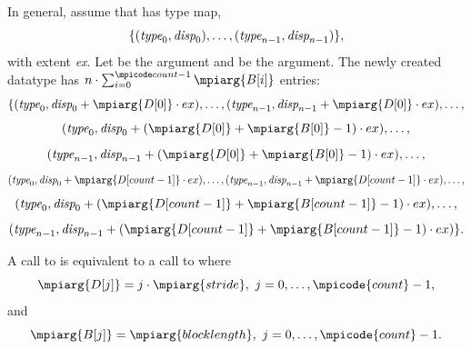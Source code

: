 In general,
assume that  has type map,
\begin{displaymath}
\{ (\textrm{\itshape{type}}_0,\textrm{\itshape{disp}}_0), \ldots, (\textrm{\itshape{type}}_{n-1}, \textrm{\itshape{disp}}_{n-1}) \} ,
\end{displaymath}
with extent \emph{ex}.
Let  be the  argument and
 be the\flushline
{} argument. The newly created datatype
has $n \cdot \sum_{i=0}^{\mscode{count}-1}
\mpiarg{B[i]}$ entries:
\begin{displaymath}
\{
(\mword{type}_0, \mword{disp}_0 + \mpiarg{D[0]} \cdot ex ) , \ldots ,
(\mword{type}_{n-1} , \mword{disp}_{n-1} + \mpiarg{D[0]} \cdot ex ) , \ldots ,
\end{displaymath}
\begin{displaymath}
(\mword{type}_0 , \mword{disp}_0 + (\mpiarg{D[0]} + \mpiarg{B[0]} -1) \cdot ex) ,\ldots,
\end{displaymath}
\begin{displaymath}
(\mword{type}_{n-1} , \mword{disp}_{n-1} + (\mpiarg{D[0]} +\mpiarg{B[0]} -1) \cdot ex ) ,
\ldots,
\end{displaymath}
\begin{displaymath}
(\mword{type}_0, \mword{disp}_0 + \mpiarg{D[count-1]} \cdot ex ) , \ldots ,
(\mword{type}_{n-1} , \mword{disp}_{n-1} + \mpiarg{D[count-1]} \cdot ex ) , \ldots ,
\end{displaymath}
\begin{displaymath}
(\mword{type}_0 , \mword{disp}_0 + (\mpiarg{D[count-1]} + \mpiarg{B[count-1]} -1) \cdot ex)
,\ldots,
\end{displaymath}
\begin{displaymath}
(\mword{type}_{n-1} , \mword{disp}_{n-1} + (\mpiarg{D[count-1]} +\mpiarg{B[count-1]} -1)
\cdot ex )
\} .
\end{displaymath}

A call to  is equivalent to a call to
 where
\begin{displaymath}
\mpiarg{D[j]} = j \cdot \mpiarg{stride},\ j=0 ,\ldots, \mpicode{count} -1 ,
\end{displaymath}
and
\begin{displaymath}
\mpiarg{B[j]} = \mpiarg{blocklength},\ j=0 ,\ldots, \mpicode{count} -1 .
\end{displaymath}

